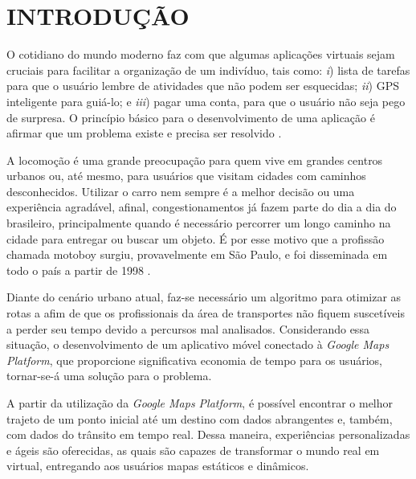 
\chapter{INTRODUÇÃO}

O cotidiano do mundo moderno faz com que algumas aplicações virtuais sejam cruciais para facilitar a organização de um indivíduo, tais como: \textit{i}) lista de tarefas para que o usuário lembre de atividades que não podem ser esquecidas; \textit{ii}) GPS inteligente para guiá-lo; e \textit{iii}) pagar uma conta, para que o usuário não seja pego de surpresa. O princípio básico para o desenvolvimento de uma aplicação é afirmar que um problema existe e precisa ser resolvido \cite{desenvWebFrame}.

A locomoção é uma grande preocupação para quem vive em grandes centros urbanos ou, até mesmo, para usuários que visitam cidades com caminhos desconhecidos. Utilizar o carro nem sempre é a melhor decisão ou uma experiência agradável, afinal, congestionamentos já fazem parte do dia a dia do brasileiro, principalmente quando é necessário percorrer um longo caminho na cidade para entregar ou buscar um objeto. É por esse motivo que a profissão chamada motoboy surgiu, provavelmente em São Paulo, e foi disseminada em todo o país a partir de 1998 \cite{MotoboyVeja}.

Diante do cenário urbano atual, faz-se necessário um algoritmo para otimizar as rotas a afim de que os profissionais da área de transportes não fiquem suscetíveis a perder seu tempo devido a percursos mal analisados. Considerando essa situação, o desenvolvimento de um aplicativo móvel conectado à \textit{Google Maps Platform}, que proporcione significativa economia de tempo para os usuários, tornar-se-á uma solução para o problema.

A partir da utilização da \textit{Google Maps Platform}, é possível encontrar o melhor trajeto de um ponto inicial até um destino com dados abrangentes e, também, com dados do trânsito em tempo real. Dessa maneira, experiências personalizadas e ágeis são oferecidas, as quais são capazes de transformar o mundo real em virtual, entregando aos usuários mapas estáticos e dinâmicos. 


